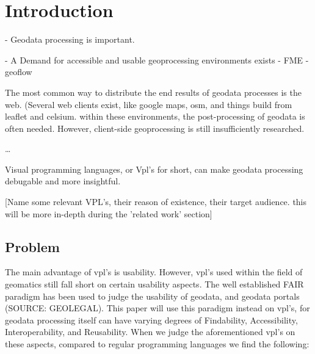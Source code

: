 \section{Introduction}

\par


- Geodata processing is important.

- A Demand for accessible and usable geoprocessing environments exists
  - FME
  - geoflow
  


The most common way to distribute the end results of geodata processes is the web. 
(Several web clients exist, like google maps, osm, and things build from leaflet and celsium. 
within these environments, the post-processing of geodata is often needed. 
However, client-side geoprocessing is still insufficiently researched.






\dots




\par
Visual programming languages, or Vpl's for short, can make geodata processing debugable and more insightful. 

[Name some relevant VPL's, their reason of existence, their target audience.
this will be more in-depth during the 'related work' section] 


\subsection{Problem}
The main advantage of vpl's is usability. 
However, vpl's used within the field of geomatics still fall short on certain usability aspects. 
The well established FAIR paradigm has been used to judge the usability of geodata, and geodata portals (SOURCE: GEOLEGAL). 
This paper will use this paradigm instead on vpl's, for geodata processing itself can have varying degrees of Findability, Accessibility, Interoperability, and Reusability. 
When we judge the aforementioned vpl's on these aspects, compared to regular programming languages we find the following: 


